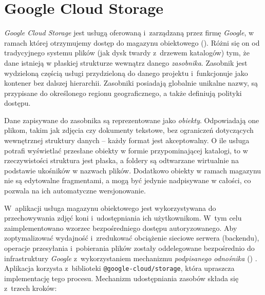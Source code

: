 \section{Google Cloud Storage} \label{sec:gcs}

\textit{Google Cloud Storage}\cite{google_storage} jest usługą oferowaną i~zarządzaną przez firmę \textit{Google}, w ramach której otrzymujemy dostęp do magazynu obiektowego (). Różni się on od tradycyjnego systemu plików (jak dysk twardy z~drzewem katalogów) tym, że dane istnieją w płaskiej strukturze wewnątrz danego \textit{zasobnika}. Zasobnik jest wydzieloną częścią usługi przydzieloną do danego projektu i~funkcjonuje jako kontener bez dalszej hierarchii. Zasobniki posiadają globalnie unikalne nazwy, są przypisane do określonego regionu geograficznego, a także definiują polityki dostępu. 

Dane zapisywane do zasobnika są reprezentowane jako \textit{obiekty}. Odpowiadają one plikom, takim jak zdjęcia czy dokumenty tekstowe, bez ograniczeń dotyczących wewnętrznej struktury danych -- każdy format jest akceptowalny. O ile usługa potrafi wyświetlać przesłane obiekty w formie przypominającej katalogi, to w rzeczywistości struktura jest płaska, a foldery są odtwarzane wirtualnie na podstawie ukośników w nazwach plików. Dodatkowo obiekty w ramach magazynu nie są edytowalne fragmentami, a mogą być jedynie nadpisywane w całości, co pozwala na ich automatyczne wersjonowanie.

W~aplikacji  usługa magazynu obiektowego jest wykorzystywana do przechowywania zdjęć koni i~udostępniania ich użytkownikom. W~tym celu zaimplementowano wzorzec bezpośredniego dostępu autoryzowanego. Aby zoptymalizować wydajność i~zredukować obciążenie sieciowe serwera (backendu), operacje przesyłania i~pobierania plików zostały oddelegowane bezpośrednio do infrastruktury \textit{Google} z~wykorzystaniem mechanizmu \textit{podpisanego odnośnika} () \cite{google_signed_urls}. Aplikacja korzysta z~biblioteki \texttt{@google-cloud/storage}, która upraszcza implementację tego procesu. Mechanizm udostępniania zasobów składa się z~trzech kroków:

